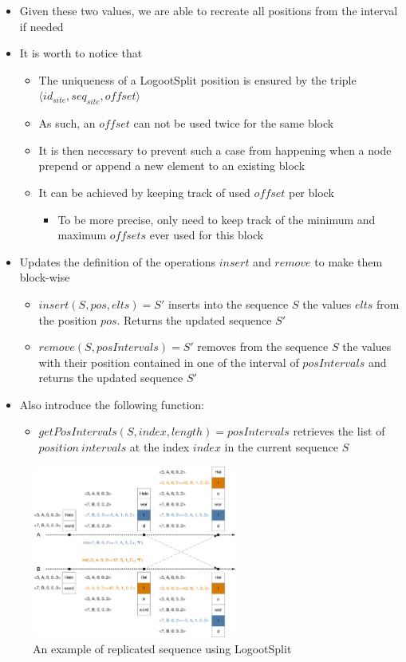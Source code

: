\documentclass{article}
\newcommand{\tuple}[1]{\langle #1 \rangle}
\newcounter{definition-counter}
\theoremstyle{definition}
\theoremstyle{definition}
\theoremstyle{definition}
\begin{document}
\begin{itemize}
    \item Given these two values, we are able to recreate all positions from the interval if needed
    \item It is worth to notice that
    \begin{itemize}
        \item The uniqueness of a LogootSplit position is ensured by the triple $\tuple{id_{site}, seq_{site}, offset}$
        \item As such, an $offset$ can not be used twice for the same block
        \item It is then necessary to prevent such a case from happening when a node prepend or append a new element to an existing block
        \item It can be achieved by keeping track of used $offset$ per block
        \begin{itemize}
            \item To be more precise, only need to keep track of the minimum and maximum $offsets$ ever used for this block
        \end{itemize}
    \end{itemize}

    \item Updates the definition of the operations $insert$ and $remove$ to make them block-wise
    \begin{itemize}
        \item $insert(S, pos, elts) = S'$ inserts into the sequence $S$ the values $elts$ from the position $pos$. Returns the updated sequence $S'$
        \item $remove(S, posIntervals) = S'$ removes from the sequence $S$ the values with their position contained in one of the interval of $posIntervals$ and returns the updated sequence $S'$
    \end{itemize}
    \item Also introduce the following function:
    \begin{itemize}
        \item $getPosIntervals(S, index, length) = posIntervals$ retrieves the list of $position \ intervals$  at the index $index$ in the current sequence $S$
    \end{itemize}
\end{itemize}

\begin{figure}
    \centering
        \includegraphics[width=0.6\textwidth]{img/logootsplit-seq.pdf}
    \caption{An example of replicated sequence using LogootSplit}
\end{figure}
\end{document}
